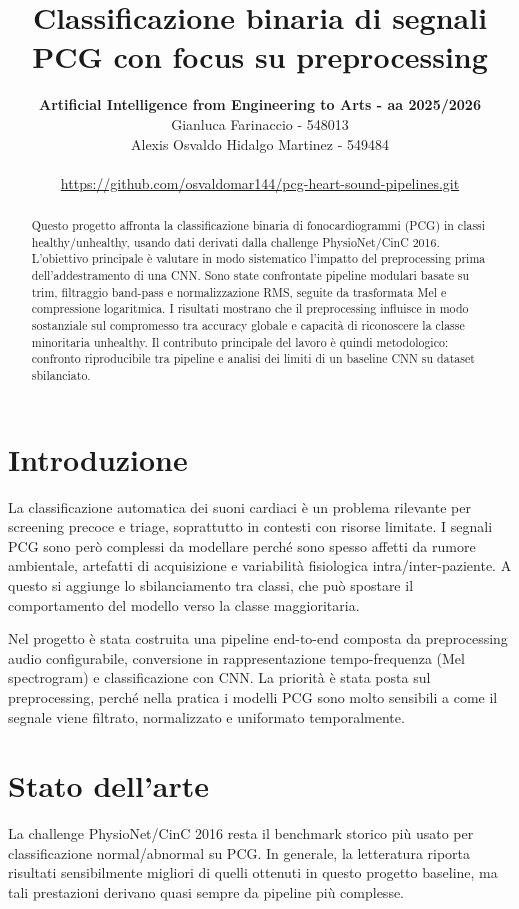 \documentclass[12pt,a4paper]{article}
\title{Classificazione binaria di segnali PCG con focus su preprocessing}
\author{
    \textbf{Artificial Intelligence from Engineering to Arts - aa 2025/2026}
    \\
    Gianluca Farinaccio - 548013 \\
    Alexis Osvaldo Hidalgo Martinez - 549484 \\
    \\
    \url{https://github.com/osvaldomar144/pcg-heart-sound-pipelines.git}
}
\begin{document}
\maketitle

\begin{abstract}
Questo progetto affronta la classificazione binaria di fonocardiogrammi (PCG) in classi
healthy/unhealthy, usando dati derivati dalla challenge PhysioNet/CinC 2016. L'obiettivo
principale è valutare in modo sistematico l'impatto del preprocessing prima dell'addestramento di
una CNN. Sono state confrontate pipeline modulari basate su trim, filtraggio band-pass e
normalizzazione RMS, seguite da trasformata Mel e compressione logaritmica. I risultati mostrano
che il preprocessing influisce in modo sostanziale sul compromesso tra accuracy globale e capacità
di riconoscere la classe minoritaria unhealthy. Il contributo principale del lavoro è quindi
metodologico: confronto riproducibile tra pipeline e analisi dei limiti di un baseline CNN su
dataset sbilanciato.
\end{abstract}

\section{Introduzione}
La classificazione automatica dei suoni cardiaci è un problema rilevante per screening precoce e
triage, soprattutto in contesti con risorse limitate. I segnali PCG sono però complessi da
modellare perché sono spesso affetti da rumore ambientale, artefatti di acquisizione e variabilità
fisiologica intra/inter-paziente. A questo si aggiunge lo sbilanciamento tra classi, che può
spostare il comportamento del modello verso la classe maggioritaria.

Nel progetto è stata costruita una pipeline end-to-end composta da preprocessing audio
configurabile, conversione in rappresentazione tempo-frequenza (Mel spectrogram) e classificazione
con CNN. La priorità è stata posta sul preprocessing, perché nella pratica i modelli PCG sono molto
sensibili a come il segnale viene filtrato, normalizzato e uniformato temporalmente.

\section{Stato dell'arte}
La challenge PhysioNet/CinC 2016 resta il benchmark storico più usato per classificazione
normal/abnormal su PCG. In generale, la letteratura riporta risultati sensibilmente migliori di
quelli ottenuti in questo progetto baseline, ma tali prestazioni derivano quasi sempre da pipeline
più complesse.
\end{document}
